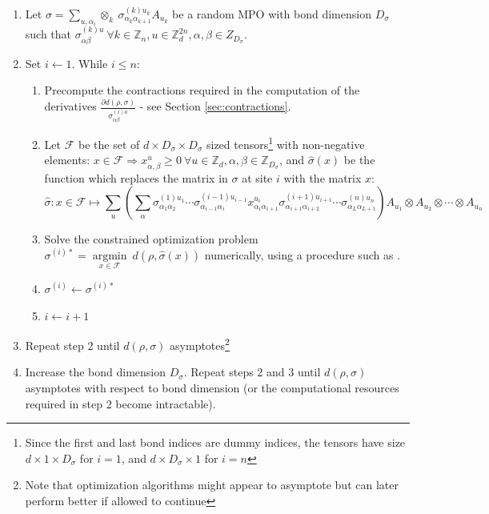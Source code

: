 \documentclass{article}
\begin{document}
\begin{enumerate}
\item Let $\sigma=\sum_{u,\alpha_i} \otimes_k\ \sigma^{(k)u_k}_{\alpha_k\alpha_{k+1}} A_{u_k}$ be a random MPO with bond dimension $D_\sigma$ such that $\sigma^{(k)u}_{\alpha\beta}\ \forall k\in \mathbb Z_n, u\in \mathbb Z_d^{2n},\alpha,\beta\in Z_{D_\sigma}$.
\item Set $i\leftarrow 1$. While $i\leq n$:
	\begin{enumerate}
		\item Precompute the contractions required in the computation of the derivatives $\frac{\partial d(\rho,\sigma)}{\sigma^{(i)a}_{\alpha\beta}}$ - see Section \ref{sec:contractions}.
		\item Let $\mathcal F$ be the set of $d\times D_\sigma\times D_\sigma$ sized tensors\footnote{Since the first and last bond indices are dummy indices, the tensors have size $d\times 1\times D_\sigma$ for $i=1$, and $d\times D_\sigma\times 1$ for $i=n$} with non-negative elements: $x\in\mathcal F\Rightarrow x^u_{\alpha,\beta}\geq 0\ \forall u\in\mathbb Z_d, \alpha,\beta\in\mathbb Z_{D_\sigma}$, and $\hat \sigma(x)$ be the function which replaces the matrix in $\sigma$ at site $i$ with the matrix $x$:
		\begin{equation}\hat \sigma:x\in \mathcal F\mapsto\sum_u\left(\sum_{\alpha}\sigma_{\alpha_1\alpha_2}^{(1)u_1}\cdots \sigma_{\alpha_{i-1}\alpha_i}^{(i-1)u_{i-1}}x^{u_i}_{\alpha_i\alpha_{i+1}}\sigma_{\alpha_{i+1}\alpha_{i+2}}^{(i+1)u_{i+1}}\cdots\sigma_{\alpha_L\alpha_{L+1}}^{(n)u_n}\right)A_{u_1}\otimes A_{u_2}\otimes\cdots\otimes A_{u_n}\end{equation}
		\item Solve the constrained optimization problem $\sigma^{(i)*}=\underset{x\in\mathcal F}{\operatorname{argmin}}\ d(\rho,\hat \sigma(x))$ numerically, using a procedure such as \cite{bfgs_large_scale}.
		\item  $\sigma^{(i)}\leftarrow \sigma^{(i)*}$
		\item $i\leftarrow i+1$
		\end{enumerate}
	\item Repeat step 2 until $d(\rho,\sigma)$ asymptotes\footnote{Note that optimization algorithms might appear to asymptote but can later perform better if allowed to continue}
	\item Increase the bond dimension $D_\sigma$. Repeat steps 2 and 3 until $d(\rho,\sigma)$ asymptotes with respect to bond dimension (or the computational resources required in step 2 become intractable).
\end{enumerate}
\end{document}
